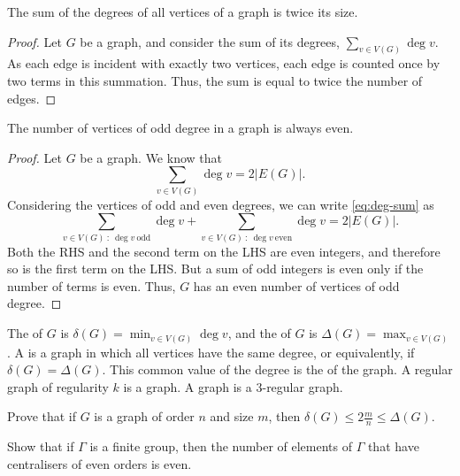 \begin{Lemma}
The sum of the degrees of all vertices of a graph is twice its size.
\end{Lemma}

\begin{proof}
Let $G$ be a graph, and consider the sum of its degrees, $\sum_{v \in V(G)} \deg v$. As each edge is incident with exactly two vertices, each edge is counted once by two terms in this summation. Thus, the sum is equal to twice the number of edges.
\end{proof}

\begin{Corollary}
The number of vertices of odd degree in a graph is always even.
\end{Corollary}

\begin{proof}
Let $G$ be a graph. We know that
\begin{equation}
\sum_{v \in V(G)} \deg v = 2 |E(G)|. \label{eq:deg-sum}
\end{equation}
Considering the vertices of odd and even degrees, we can write \eqref{eq:deg-sum} as
\begin{equation}
\sum_{v \in V(G) ~:~ \deg v\ \text{odd}} \deg v + \sum_{v \in V(G) ~:~ \deg v\ \text{even}} \deg v = 2 |E(G)|.
\end{equation}
Both the RHS and the second term on the LHS are even integers, and therefore so is the first term on the LHS. But a sum of odd integers is even only if the number of terms is even. Thus, $G$ has an even number of vertices of odd degree.
\end{proof}

The  of $G$ is $\delta(G) = \min_{v \in V(G)} \deg v$, and the  of $G$ is $\Delta(G) = \max_{v \in V(G)}$. A  is a graph in which all vertices have the same degree, or equivalently, if $\delta(G) = \Delta(G)$. This common value of the degree is the  of the graph. A regular graph of regularity $k$ is a  graph. A  graph is a $3$-regular graph.

\begin{Exercise}
Prove that if $G$ is a graph of order $n$ and size $m$, then $\delta(G) \le 2\frac m n \le \Delta(G)$.
\end{Exercise}

\begin{Exercise}
Show that if $\Gamma$ is a finite group, then the number of elements of $\Gamma$ that have centralisers of even orders is even.
\end{Exercise}

